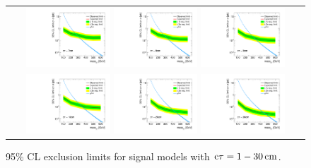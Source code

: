 \begin{figure}[!h]
\begin{tabular}{c}
    \includegraphics[width=0.29\textwidth]{figures/analysis/Interpretation/ExclusionLimits/LimitPlot_ctau7cm.pdf} 
    \includegraphics[width=0.29\textwidth]{figures/analysis/Interpretation/ExclusionLimits/LimitPlot_ctau8cm.pdf} 
    \includegraphics[width=0.29\textwidth]{figures/analysis/Interpretation/ExclusionLimits/LimitPlot_ctau9cm.pdf} \\
    \includegraphics[width=0.29\textwidth]{figures/analysis/Interpretation/ExclusionLimits/LimitPlot_ctau10cm.pdf} 
    \includegraphics[width=0.29\textwidth]{figures/analysis/Interpretation/ExclusionLimits/LimitPlot_ctau20cm.pdf} 
    \includegraphics[width=0.29\textwidth]{figures/analysis/Interpretation/ExclusionLimits/LimitPlot_ctau30cm.pdf} \\
  \end{tabular}
  \caption{95\% CL exclusion limits for signal models with $\text{c}\tau = 1-30\,\text{cm}$.}
  \label{fig:1dLimitsA}
\end{figure}

